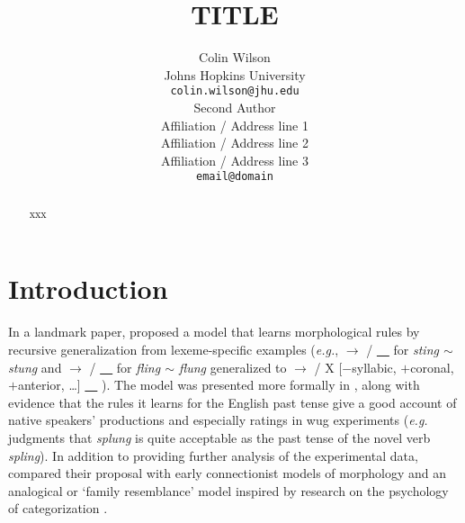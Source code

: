 \documentclass[11pt]{article}
\title{TITLE}
\author{Colin Wilson\\
  Johns Hopkins University \\
  \texttt{colin.wilson@jhu.edu} \\\And
  Second Author \\
  Affiliation / Address line 1 \\
  Affiliation / Address line 2 \\
  Affiliation / Address line 3 \\
  \texttt{email@domain} \\}
\begin{document}
\maketitle
\begin{abstract}
xxx
\end{abstract}

\section{Introduction}

In a landmark paper, \citet{albright2003} proposed a model that learns morphological rules by recursive generalization from lexeme-specific examples (\emph{e.g.},  $\to$  /  \underline{\ \ }  for \emph{sting $\sim$ stung} and  $\to$  /  \underline{\ \ }  for \emph{fling $\sim$ flung} generalized to   $\to$  / X [$-$syllabic, $+$coronal, $+$anterior, \ldots] \underline{\ \ } ). The model was presented more formally in \citet{albright2002a}, along with evidence that the rules it learns for the English past tense give a good account of native speakers' productions and especially ratings in wug experiments (\emph{e.g.} judgments that \textit{splung} is quite acceptable as the past tense of the novel verb \textit{spling}). In addition to providing further analysis of the experimental data, \citet{albright2003} compared their proposal with early connectionist models of morphology \citep[\emph{e.g.,}][]{plunkett1999} and an analogical or `family resemblance' model inspired by research on the psychology of categorization \citep{nakisa2001}.

\end{document}
